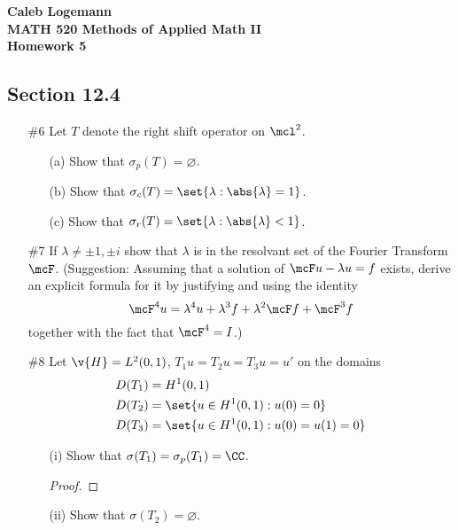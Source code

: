 \documentclass[11pt, oneside]{article}
\begin{document}
\noindent \textbf{\Large{Caleb Logemann \\
MATH 520 Methods of Applied Math II \\
Homework 5
}}

\subsection*{Section 12.4}
\begin{enumerate}
  \item[\#6]
    Let $T$ denote the right shift operator on $\mcl^2$.
    \begin{enumerate}
      \item[(a)]
        Show that $\sigma_p(T) = \varnothing$.

      \item[(b)]
        Show that $\sigma_c(T) = \set{\lambda: \abs{\lambda}= 1}$.

      \item[(c)]
        Show that $\sigma_r(T) = \set{\lambda: \abs{\lambda} < 1}$.
    \end{enumerate}

  \pagebreak
  \item[\#7]
    If $\lambda \neq \pm 1, \pm i$ show that $\lambda$ is in the resolvant set
    of the Fourier Transform $\mcF$.
    (Suggestion: Assuming that a solution of $\mcF u - \lambda u = f$ exists,
    derive an explicit formula for it by justifying and using the identity
    \[
      \mcF^4 u = \lambda^4 u + \lambda^3 f + \lambda^2 \mcF f + \mcF^3 f
    \]
    together with the fact that $\mcF^4 = I$.)

  \pagebreak
  \item[\#8]
    Let $\v{H} = L^2(0, 1)$, $T_1 u = T_2 u = T_3 u = u'$ on the domains
    \begin{align*}
      D(T_1) &= H^1(0, 1) \\
      D(T_2) &= \set{u \in H^1(0,1): u(0) = 0} \\
      D(T_3) &= \set{u \in H^1(0, 1): u(0) = u(1) = 0}
    \end{align*}
    \begin{enumerate}
      \item[(i)]
        Show that $\sigma(T_1) = \sigma_p(T_1) = \CC$.

        \begin{proof}
          
        \end{proof}

      \item[(ii)]
        Show that $\sigma(T_2) = \varnothing$.


\end{enumerate}
\end{enumerate}
\end{document}
